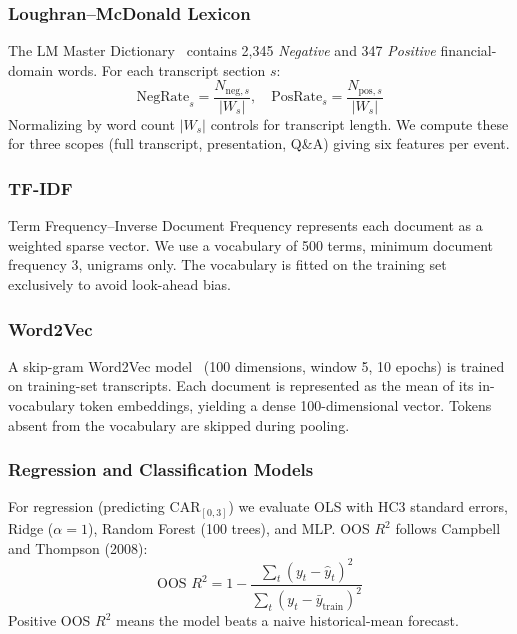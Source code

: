 \documentclass[conference]{IEEEtran}
\begin{document}
\subsubsection{Loughran--McDonald Lexicon}

The LM Master Dictionary~\cite{ref_omoseebi2023} contains 2,345 \emph{Negative}
and 347 \emph{Positive} financial-domain words. For each transcript section $s$:
\begin{equation}
\text{NegRate}_s = \frac{N_{\text{neg},s}}{|W_s|}, \quad
\text{PosRate}_s = \frac{N_{\text{pos},s}}{|W_s|}
\end{equation}
Normalizing by word count $|W_s|$ controls for transcript length.
We compute these for three scopes (full transcript, presentation, Q\&A)
giving six features per event.

\subsubsection{TF-IDF}

Term Frequency--Inverse Document Frequency represents each document as a
weighted sparse vector. We use a vocabulary of 500 terms, minimum document
frequency 3, unigrams only. The vocabulary is fitted on the training set
exclusively to avoid look-ahead bias.

\subsubsection{Word2Vec}

A skip-gram Word2Vec model~\cite{ref_suzuki2020} (100 dimensions, window 5,
10 epochs) is trained on training-set transcripts. Each document is represented
as the mean of its in-vocabulary token embeddings, yielding a dense 100-dimensional
vector. Tokens absent from the vocabulary are skipped during pooling.

\subsubsection{Regression and Classification Models}

For regression (predicting CAR$_{[0,3]}$) we evaluate OLS with HC3
standard errors, Ridge ($\alpha = 1$), Random Forest (100 trees), and MLP.
OOS $R^2$ follows Campbell and Thompson (2008):
\begin{equation}
\text{OOS }R^2 = 1 - \frac{\sum_t (y_t - \hat{y}_t)^2}{\sum_t (y_t - \bar{y}_{\text{train}})^2}
\end{equation}
Positive OOS $R^2$ means the model beats a naive historical-mean forecast.
\end{document}
